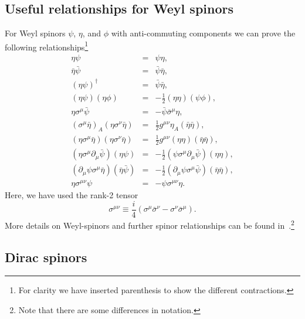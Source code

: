 \documentclass[notes.tex]{subfiles}
\begin{document}
\subsection{Useful relationships for Weyl spinors}
\label{sec:Weylspinor_calc}
For Weyl spinors $\psi$, $\eta$, and $\phi$ with anti-commuting components we can prove the following relationships\footnote{For clarity we have inserted parenthesis to show the different contractions.} 
\begin{eqnarray}
\eta\psi 				&=& \psi\eta,  \label{eq:Weylspinor_etapsi}  \\
\bar\eta\bar\psi 			&=& \bar\psi\bar\eta, \label{eq:Weylspinor_contraction_order_bared} \\
(\eta\psi)^\dagger 		&=& \bar\psi\bar\eta,  \\
(\eta\psi)(\eta\phi) 		&=& -\frac{1}{2}(\eta\eta)(\psi\phi), \label{eq:Weylspinor_etapsietapsi}  \\
\eta\sigma^\mu\bar\psi 	&=& - \bar\psi\bar\sigma^\mu\eta,  \label{eq:Weylspinor_etasigmapsi} \\
(\sigma^\mu \bar{\eta})_A(\eta\sigma^\nu \bar{\eta})&=&\frac{1}{2}g^{\mu\nu}\eta_A(\bar{\eta}\bar{\eta}), \label{eq:Weylspinor_sigmaetaetasigmaeta}\\
(\eta\sigma^\mu \bar{\eta})(\eta\sigma^\nu \bar{\eta})&=&\frac{1}{2}g^{\mu\nu}(\eta\eta)(\bar{\eta}\bar{\eta}),   \label{eq:Weylspinor_etasigmamuetaetasigmanueta} \\
(\eta\sigma^\mu\partial_\mu \bar\psi )(\eta\psi) &=& -\frac{1}{2}(\psi\sigma^\mu\partial_\mu \bar\psi)(\eta\eta),\\
(\partial_\mu\psi\sigma^\mu \bar\eta)(\bar\eta\bar\psi) &=& -\frac{1}{2}(\partial_\mu\psi\sigma^\mu \bar\psi)(\bar\eta\bar\eta), \label{eq:Weylspinor_last} \\
\eta\sigma^{\mu\nu}\psi	&=&-\psi\sigma^{\mu\nu}\eta.   \label{eq:Weylspinor_etasigmamunupsi} 
\end{eqnarray}
Here,  we have used the rank-2 tensor
\begin{equation*}
\sigma^{\mu\nu} \equiv \frac{i}{4}(\sigma^\mu \bar{\sigma}^\nu - \sigma^\nu \bar{\sigma}^\mu).
\end{equation*}
More details on Weyl-spinors and further spinor relationships can be found in~\cite{Dreiner:2008tw}.\footnote{Note that there are some differences in notation.}


\subsection{Dirac spinors}
\label{sec:Dirac_spinors}
\end{document}
